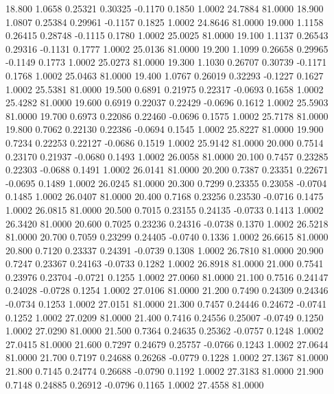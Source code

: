  18.800   1.0658   0.25321   0.30325  -0.1170   0.1850   1.0002  24.7884  81.0000
  18.900   1.0807   0.25384   0.29961  -0.1157   0.1825   1.0002  24.8646  81.0000
  19.000   1.1158   0.26415   0.28748  -0.1115   0.1780   1.0002  25.0025  81.0000
  19.100   1.1137   0.26543   0.29316  -0.1131   0.1777   1.0002  25.0136  81.0000
  19.200   1.1099   0.26658   0.29965  -0.1149   0.1773   1.0002  25.0273  81.0000
  19.300   1.1030   0.26707   0.30739  -0.1171   0.1768   1.0002  25.0463  81.0000
  19.400   1.0767   0.26019   0.32293  -0.1227   0.1627   1.0002  25.5381  81.0000
  19.500   0.6891   0.21975   0.22317  -0.0693   0.1658   1.0002  25.4282  81.0000
  19.600   0.6919   0.22037   0.22429  -0.0696   0.1612   1.0002  25.5903  81.0000
  19.700   0.6973   0.22086   0.22460  -0.0696   0.1575   1.0002  25.7178  81.0000
  19.800   0.7062   0.22130   0.22386  -0.0694   0.1545   1.0002  25.8227  81.0000
  19.900   0.7234   0.22253   0.22127  -0.0686   0.1519   1.0002  25.9142  81.0000
  20.000   0.7514   0.23170   0.21937  -0.0680   0.1493   1.0002  26.0058  81.0000
  20.100   0.7457   0.23285   0.22303  -0.0688   0.1491   1.0002  26.0141  81.0000
  20.200   0.7387   0.23351   0.22671  -0.0695   0.1489   1.0002  26.0245  81.0000
  20.300   0.7299   0.23355   0.23058  -0.0704   0.1485   1.0002  26.0407  81.0000
  20.400   0.7168   0.23256   0.23530  -0.0716   0.1475   1.0002  26.0815  81.0000
  20.500   0.7015   0.23155   0.24135  -0.0733   0.1413   1.0002  26.3420  81.0000
  20.600   0.7025   0.23236   0.24316  -0.0738   0.1370   1.0002  26.5218  81.0000
  20.700   0.7059   0.23299   0.24405  -0.0740   0.1336   1.0002  26.6615  81.0000
  20.800   0.7120   0.23337   0.24391  -0.0739   0.1308   1.0002  26.7810  81.0000
  20.900   0.7247   0.23367   0.24163  -0.0733   0.1282   1.0002  26.8918  81.0000
  21.000   0.7541   0.23976   0.23704  -0.0721   0.1255   1.0002  27.0060  81.0000
  21.100   0.7516   0.24147   0.24028  -0.0728   0.1254   1.0002  27.0106  81.0000
  21.200   0.7490   0.24309   0.24346  -0.0734   0.1253   1.0002  27.0151  81.0000
  21.300   0.7457   0.24446   0.24672  -0.0741   0.1252   1.0002  27.0209  81.0000
  21.400   0.7416   0.24556   0.25007  -0.0749   0.1250   1.0002  27.0290  81.0000
  21.500   0.7364   0.24635   0.25362  -0.0757   0.1248   1.0002  27.0415  81.0000
  21.600   0.7297   0.24679   0.25757  -0.0766   0.1243   1.0002  27.0644  81.0000
  21.700   0.7197   0.24688   0.26268  -0.0779   0.1228   1.0002  27.1367  81.0000
  21.800   0.7145   0.24774   0.26688  -0.0790   0.1192   1.0002  27.3183  81.0000
  21.900   0.7148   0.24885   0.26912  -0.0796   0.1165   1.0002  27.4558  81.0000
